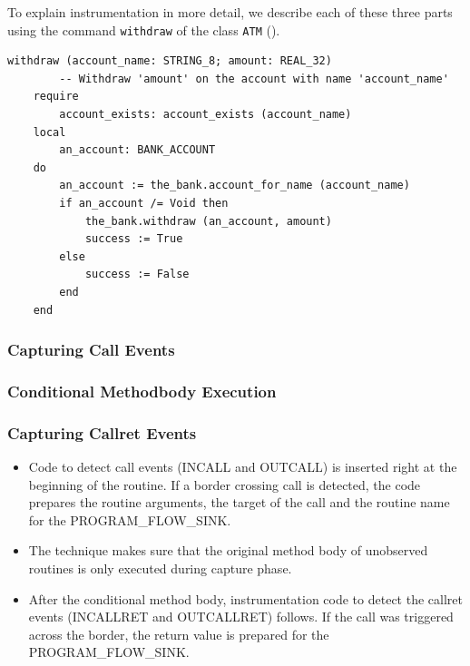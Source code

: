 To explain instrumentation in more detail, we describe each of these three parts using the command \texttt{withdraw} of the class \texttt{ATM} ().

\begin{lstlisting}[caption=Original Code of Command \texttt{withdraw} ,label=lst:withdraw_original]
withdraw (account_name: STRING_8; amount: REAL_32)
		-- Withdraw 'amount' on the account with name 'account_name'
	require
		account_exists: account_exists (account_name)
	local
		an_account: BANK_ACCOUNT
	do
		an_account := the_bank.account_for_name (account_name)
		if an_account /= Void then
			the_bank.withdraw (an_account, amount)
			success := True
		else
			success := False
		end
	end
\end{lstlisting}

\subsubsection{Capturing Call Events}
\subsubsection{Conditional Methodbody Execution}
\subsubsection{Capturing Callret Events}



\begin{itemize}
 \item Code to detect call events (INCALL and OUTCALL) is inserted right at the beginning of the routine. If a border crossing call is detected, the code prepares the routine arguments, the target of the call and the routine name for the PROGRAM\_FLOW\_SINK.
 \item The technique makes sure that the original method body of unobserved routines is only executed during capture phase.
 \item After the conditional method body, instrumentation code to detect the callret events (INCALLRET and OUTCALLRET) follows. If the call was triggered across the border, the return value is prepared for the PROGRAM\_FLOW\_SINK.
\end{itemize}




